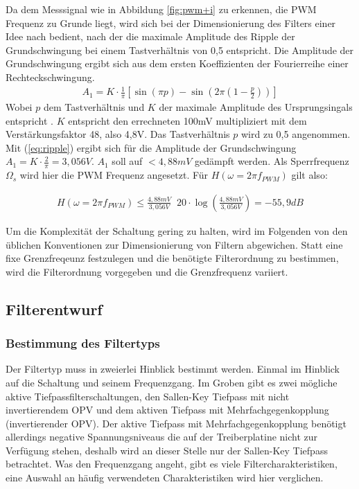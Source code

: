 Da dem Messsignal wie in Abbildung \ref{fig:pwm+i} zu erkennen, die PWM Frequenz zu Grunde liegt, wird sich bei der Dimensionierung des Filters einer Idee nach \cite{Alter2008} bedient, nach der die maximale Amplitude des Ripple der Grundschwingung bei einem
Tastverhältnis von 0,5 entspricht. Die Amplitude der Grundschwingung ergibt sich aus dem ersten Koeffizienten der Fourierreihe einer Rechteckschwingung.
\begin{align}
A_1 = K\cdot \frac{1}{\pi}[\sin(\pi p)-\sin(2\pi(1-\frac{p}{2}))]
\label{eq:ripple}
\end{align}
Wobei $p$ dem Tastverhältnis und $K$ der maximale Amplitude des Ursprungsingals entspricht \cite{Alter2008}. $K$ entspricht den errechneten 100mV multipliziert mit dem Verstärkungsfaktor 48, also 4,8V. Das Tastverhältnis $p$ wird zu 0,5
angenommen. Mit (\ref{eq:ripple}) ergibt sich für die Amplitude der Grundschwingung $ A_1 = K\cdot \frac{2}{\pi} = 3,056V$. $A_1$ soll auf $ < 4,88mV$ gedämpft werden.
Als Sperrfrequenz $\Omega_s $ wird hier die PWM Frequenz angesetzt. Für $H(\omega=2\pi f_{PWM})$ gilt also:

\begin{align}
H(\omega=2\pi f_{PWM}) \le \frac{4,88mV}{3,056V} \mathop{\hat{=}} 20\cdot\log(\frac{4,88mV}{3,056V})= -55,9 dB
\label{eq:daempfung}
\end{align}

Um die Komplexität der Schaltung gering zu halten, wird im Folgenden von den üblichen Konventionen zur Dimensionierung von Filtern abgewichen.
Statt eine fixe Grenzfreqeunz festzulegen und die benötigte Filterordnung zu bestimmen, wird die Filterordnung vorgegeben und die Grenzfrequenz variiert.

\subsection{Filterentwurf}

\subsubsection{Bestimmung des Filtertyps}

Der Filtertyp muss in zweierlei Hinblick bestimmt werden. Einmal im Hinblick auf die Schaltung und seinem Frequenzgang.
Im Groben gibt es zwei mögliche aktive Tiefpassfilterschaltungen, den Sallen-Key Tiefpass mit nicht invertierendem OPV und dem aktiven Tiefpass mit Mehrfachgegenkopplung 
(invertierender OPV). Der aktive Tiefpass mit Mehrfachgegenkopplung benötigt allerdings negative Spannungsniveaus die auf der Treiberplatine nicht zur
Verfügung stehen, deshalb wird an dieser Stelle nur der Sallen-Key Tiefpass betrachtet.
Was den Frequenzgang angeht, gibt es viele Filtercharakteristiken, eine Auswahl an häufig verwendeten Charakteristiken wird hier verglichen.

